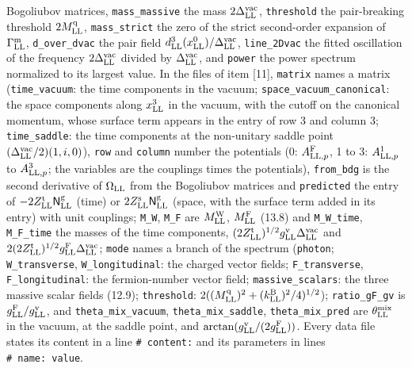 \documentclass[
  10pt,
]{article}
\begin{document}
Bogoliubov matrices, \texttt{mass\_massive} the mass
\(2\Delta^{\rm vac}_{\rm LL}\), \texttt{threshold} the pair-breaking
threshold \(2M^{\rm q}_{\rm LL}\), \texttt{mass\_strict} the zero of the
strict second-order expansion of \(\Gamma^{\rm m}_{\rm LL}\),
\texttt{d\_over\_dvac} the pair field
\(d^3_{\rm LL}(x^0_{\rm LL})/\Delta^{\rm vac}_{\rm LL}\),
\texttt{line\_2Dvac} the fitted oscillation of the frequency
\(2\Delta^{\rm vac}_{\rm LL}\) divided by \(\Delta^{\rm vac}_{\rm LL}\),
and \texttt{power} the power spectrum normalized to its largest value.
In the files of item {[}11{]}, \texttt{matrix} names a matrix
(\texttt{time\_vacuum}: the time components in the vacuum;
\texttt{space\_vacuum\_canonical}: the space components along
\(x^3_{\rm LL}\) in the vacuum, with the cutoff on the canonical
momentum, whose surface term appears in the entry of row 3 and column 3;
\texttt{time\_saddle}: the time components at the non-unitary saddle
point \((\Delta^{\rm vac}_{\rm LL}/2)(1,i,0)\)), \texttt{row} and
\texttt{column} number the potentials (0: \(A^{\rm F}_{{\rm LL},p}\), 1
to 3: \(A^1_{{\rm LL},p}\) to \(A^3_{{\rm LL},p}\); the variables are
the couplings times the potentials), \texttt{from\_bdg} is the second
derivative of \(\Omega_{\rm LL}\) from the Bogoliubov matrices and
\texttt{predicted} the entry of
\(-2Z^{\rm t}_{\rm LL}\mathsf N^{\rm g}_{\rm LL}\) (time) or
\(2Z^{\rm s}_{\rm LL}\mathsf N^{\rm g}_{\rm LL}\) (space, with the
surface term added in its entry) with unit couplings; \texttt{M\_W},
\texttt{M\_F} are \(M^{\rm W}_{\rm LL}\), \(M^{\rm F}_{\rm LL}\) (13.8)
and \texttt{M\_W\_time}, \texttt{M\_F\_time} the masses of the time
components,
\((2Z^{\rm t}_{\rm LL})^{1/2}g^{\rm v}_{\rm LL}\Delta^{\rm vac}_{\rm LL}\)
and
\(2(2Z^{\rm t}_{\rm LL})^{1/2}g^{\rm F}_{\rm LL}\Delta^{\rm vac}_{\rm LL}\);
\texttt{mode} names a branch of the spectrum (\texttt{photon};
\texttt{W\_transverse}, \texttt{W\_longitudinal}: the charged vector
fields; \texttt{F\_transverse}, \texttt{F\_longitudinal}: the
fermion-number vector field; \texttt{massive\_scalars}: the three
massive scalar fields (12.9); \texttt{threshold}:
\(2((M^{\rm q}_{\rm LL})^2+(k^{\rm B}_{\rm LL})^2/4)^{1/2}\));
\texttt{ratio\_gF\_gv} is \(g^{\rm F}_{\rm LL}/g^{\rm v}_{\rm LL}\), and
\texttt{theta\_mix\_vacuum}, \texttt{theta\_mix\_saddle},
\texttt{theta\_mix\_pred} are \(\theta^{\rm mix}_{\rm LL}\) in the
vacuum, at the saddle point, and
\(\arctan(g^{\rm v}_{\rm LL}/(2g^{\rm F}_{\rm LL}))\). Every data file
states its content in a line \texttt{\#\ content:} and its parameters in
lines \texttt{\#\ name:\ value}.
\end{document}
